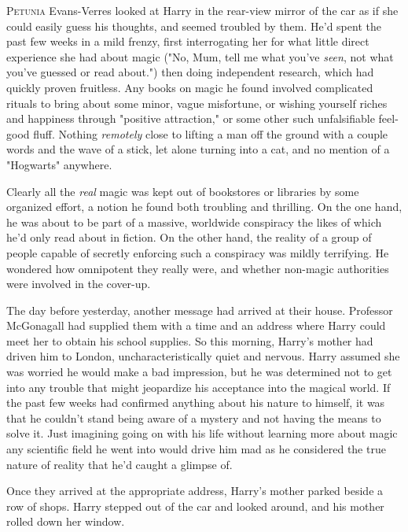 
\lettrine{P}{etunia} Evans-Verres looked at Harry in the rear-view
mirror of the car as if she could easily guess his thoughts,
and seemed troubled by them. He'd spent the past few
weeks in a mild frenzy, first interrogating her for what little
direct experience she had about magic ("No, Mum, tell me
what you've \emph{seen}, not what you've guessed or read
about.") then doing independent research, which had
quickly proven fruitless. Any books on magic he found
involved complicated rituals to bring about some minor,
vague misfortune, or wishing yourself riches and happiness
through "positive attraction," or some other such
unfalsifiable feel-good fluff. Nothing \emph{remotely} close to lifting
a man off the ground with a couple words and the wave
of a stick, let alone turning into a cat, and no mention of
a "Hogwarts" anywhere.

Clearly all the \emph{real} magic was kept out of bookstores or
libraries by some organized effort, a notion he found both
troubling and thrilling. On the one hand, he was about to
be part of a massive, worldwide conspiracy the likes of
which he'd only read about in fiction. On the other hand,
the reality of a group of people capable of secretly
enforcing such a conspiracy was mildly terrifying. He
wondered how omnipotent they really were, and whether
non-magic authorities were involved in the cover-up.

The day before yesterday, another message had
arrived at their house. Professor McGonagall had supplied
them with a time and an address where Harry could meet
her to obtain his school supplies. So this morning, Harry's
mother had driven him to London, uncharacteristically quiet
and nervous. Harry assumed she was worried he would
make a bad impression, but he was determined not to get
into any trouble that might jeopardize his acceptance into
the magical world. If the past few weeks had confirmed
anything about his nature to himself, it was that he
couldn't stand being aware of a mystery and not having
the means to solve it. Just imagining going on with his life
without learning more about magic{\el} any scientific field he
went into would drive him mad as he considered the true
nature of reality that he'd caught a glimpse of.

Once they arrived at the appropriate address, Harry's
mother parked beside a row of shops. Harry stepped out
of the car and looked around, and his mother rolled down
her window.

